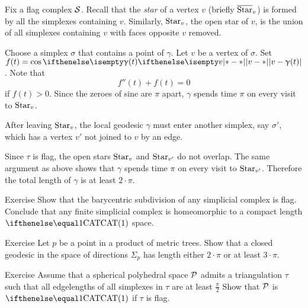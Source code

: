 Fix a flag complex $\mathcal{S}$.
Recall that the  \emph{star} of a vertex $v$ (briefly $\overline {\mathop{\rm Star}\nolimits}_v$)
is formed by all the simplexes  containing $v$. Similarly, $\mathop{\rm Star}\nolimits_v$,   the open star of $v$, is the union of all simplexes containing $v$ with faces opposite $v$ removed.

Choose a simplex $\sigma$ that contains a point of $\gamma$.
Let $v$ be a vertex of $\sigma$.
Set $f(t)=\cos\dist{v}{\gamma(t)}{}$.
Note that 
\[f''(t)+f(t)=0\] if $f(t)>0$.  
Since the zeroes of sine are $\pi$ apart,
$\gamma$ 
spends time $\pi$ on every visit to $\mathop{\rm Star}\nolimits_v$.

After leaving $\mathop{\rm Star}\nolimits_v$,
the local geodesic $\gamma$ must enter another simplex, 
say $\sigma'$, 
which has a vertex $v'$ not joined to $v$ by an edge.

Since $\tau$ is flag, the open  stars $\mathop{\rm Star}\nolimits_v$ and $\mathop{\rm Star}\nolimits_{v'}$
do not overlap.
The same argument as above shows that $\gamma$ spends time $\pi$ on every visit to $\mathop{\rm Star}\nolimits_{v'}$.
Therefore the total length of $\gamma$ is at least $2\cdot\pi$.
\qeds

\begin{thm}{Exercise}\label{ex:barycenric-flag}
Show that the barycentric subdivision of any simplicial complex is flag.
Conclude that any finite  simplicial complex is homeomorphic to a compact length $\CAT1$ space.
\end{thm}

\begin{thm}{Exercise}\label{ex:tree-product}
Let $p$ be a point in a product of metric trees.
Show that a closed geodesic in the space of directions $\Sigma_p$ has length either $2\cdot\pi$ or at least $3\cdot\pi$.
\end{thm}


\begin{thm}{Exercise}\label{ex:obtuce-flag}
Assume that a spherical polyhedral space $\mathcal{P}$
admits a triangulation $\tau$ such that all edgelengths of all simplexes in $\tau$ are at least $\tfrac\pi2$
Show that $\mathcal{P}$ is $\CAT{1}$
if $\tau$ is flag.
\end{thm}

